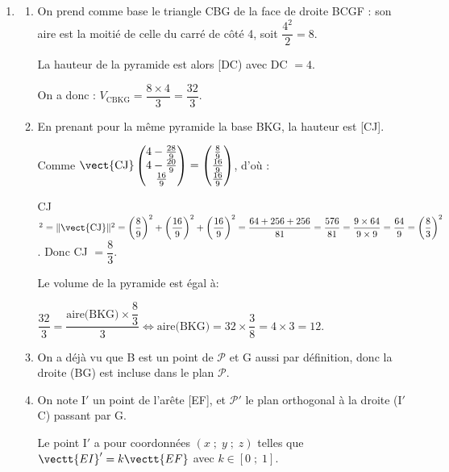\begin{enumerate}
\begin{enumerate}
Conclusion : les deux points B et K sont communs aux deux plans, donc l'intersection des plans $\mathcal{P}$ et (ABC) est la droite (BK).
	\end{enumerate}
	
\item 
	\begin{enumerate}
		\item 
		On prend comme base le triangle CBG de la face de droite BCGF  : son aire est la moitié de celle du carré de côté 4, soit $\dfrac{4^2}{2} = 8$.
		
La hauteur de la pyramide est alors [DC) avec DC $= 4$.

On a donc : $V_{\text{CBKG}} = \dfrac{8 \times 4}{3} = \dfrac{32}{3}$.
		\item 
En prenant pour la même pyramide la base BKG, la hauteur est [CJ].
		
Comme $\vect{\text{CJ}}\begin{pmatrix}4 - \frac{28}{9}\\4 - \frac{20}{9}\\ \frac{16}{9}\end{pmatrix} = \begin{pmatrix}\frac89\\\frac{16}{9}\\\frac{16}{9} \end{pmatrix}$, d'où :
		
CJ$^2 = \|\vect{\text{CJ}}\|^2 = \left(\dfrac89\right)^2 + \left(\dfrac{16}{9}\right)^2  + \left(\dfrac{16}{9}\right)^2 = \dfrac{64 + 256 + 256}{81} = \dfrac{576}{81} = \dfrac{9 \times 64}{9 \times 9} = \dfrac{64}{9} = \left(\dfrac83\right)^2$. Donc CJ $= \dfrac83$.

Le volume de la pyramide est égal à:

$\dfrac{32}{3} = \dfrac{\text{aire(BKG)} \times \dfrac83}{3} \iff \text{aire(BKG)} = 32 \times \dfrac38 = 4 \times 3 = 12$.

		\item 
		On a déjà vu que B est un point de $\mathcal{P}$ et G aussi par définition, donc la droite (BG) est incluse dans le plan $\mathcal{P}$.

		\item On note I$'$ un point de l'arête [EF], et $\mathcal{P}'$ le plan orthogonal à la droite (I$'$C) passant par G.
		


Le point I$'$ a pour coordonnées $(x\;;\;y\;;\;z)$ telles que 
$\vectt{EI}' = k\vectt{EF}$ avec $k\in [0\;;\;1]$.


\end{enumerate}
\end{enumerate}
